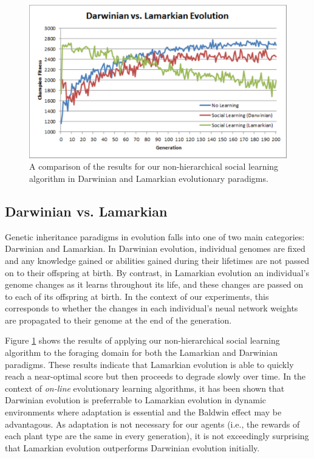 \documentclass{acm_proc_article-sp}
\begin{document}
\begin{figure}
  \centering
    \includegraphics[scale=.35]{darwin_lamark.pdf}
  \caption{A comparison of the results for our non-hierarchical social learning algorithm in Darwinian and Lamarkian evolutionary paradigms.}
  \label{fig:darwin-lamark}
\end{figure}

\subsection*{Darwinian vs. Lamarkian}
Genetic inheritance paradigms in evolution falls into one of two main categories: Darwinian and Lamarkian. In Darwinian evolution, individual genomes are fixed and any knowledge gained or abilities gained during their lifetimes are not passed on to their offspring at birth. By contrast, in Lamarkian evolution an individual's genome changes as it learns throughout its life, and these changes are passed on to each of its offspring at birth. In the context of our experiments, this corresponds to whether the changes in each individual's neual network weights are propagated to their genome at the end of the generation.

Figure \ref{fig:darwin-lamark} shows the results of applying our non-hierarchical social learning algorithm to the foraging domain for both the Lamarkian and Darwinian paradigms. These results indicate that Lamarkian evolution is able to quickly reach a near-optimal score but then proceeds to degrade slowly over time. In the context of \textit{on-line} evolutionary learning algorithms, it has been shown \cite{whiteson2006evolutionary} that Darwinian evolution is preferrable to Lamarkian evolution in dynamic environments where adaptation is essential and the Baldwin effect \cite{simpson1953baldwin} may be advantagous. As adaptation is not necessary for our agents (i.e., the rewards of each plant type are the same in every generation), it is not exceedingly surprising that Lamarkian evolution outperforms Darwinian evolution initially.
\end{document}

